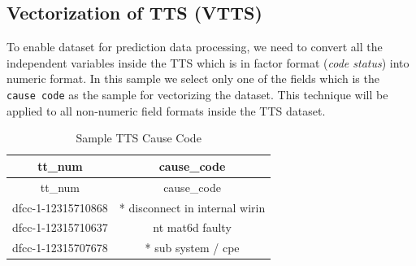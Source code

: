 \documentclass[]{article}
\begin{document}
\subsection{Vectorization of TTS
(VTTS)}\label{vectorization-of-tts-vtts}

To enable dataset for prediction data processing, we need to convert all
the independent variables inside the TTS which is in factor format
(\emph{code status}) into numeric format. In this sample we select only
one of the fields which is the \texttt{cause\ code} as the sample for
vectorizing the dataset. This technique will be applied to all
non-numeric field formats inside the TTS dataset.

\begin{longtable}[c]{@{}cc@{}}
\caption{Sample TTS Cause Code}\tabularnewline
\toprule
\begin{minipage}[b]{0.25\columnwidth}\centering\strut
tt\_num
\strut\end{minipage} &
\begin{minipage}[b]{0.39\columnwidth}\centering\strut
cause\_code
\strut\end{minipage}\tabularnewline
\midrule
\endfirsthead
\toprule
\begin{minipage}[b]{0.25\columnwidth}\centering\strut
tt\_num
\strut\end{minipage} &
\begin{minipage}[b]{0.39\columnwidth}\centering\strut
cause\_code
\strut\end{minipage}\tabularnewline
\midrule
\endhead
\begin{minipage}[t]{0.25\columnwidth}\centering\strut
dfcc-1-12315710868
\strut\end{minipage} &
\begin{minipage}[t]{0.39\columnwidth}\centering\strut
* disconnect in internal wirin
\strut\end{minipage}\tabularnewline
\begin{minipage}[t]{0.25\columnwidth}\centering\strut
dfcc-1-12315710637
\strut\end{minipage} &
\begin{minipage}[t]{0.39\columnwidth}\centering\strut
nt mat6d faulty
\strut\end{minipage}\tabularnewline
\begin{minipage}[t]{0.25\columnwidth}\centering\strut
dfcc-1-12315707678
\strut\end{minipage} &
\begin{minipage}[t]{0.39\columnwidth}\centering\strut
* sub system / cpe

\end{minipage}
\end{longtable}
\end{document}
